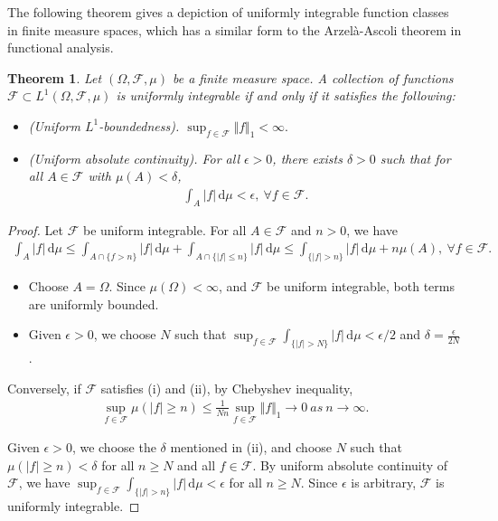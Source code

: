 \documentclass{article}
\numberwithin{equation}{section}
\renewcommand{\d}{\mathrm{d}}
\theoremstyle{plain}
\newtheorem{theorem}{Theorem}[section]
\theoremstyle{definition}
\begin{document}
The following theorem gives a depiction of uniformly integrable function classes in finite measure spaces, which has a similar form to the Arzelà-Ascoli theorem in functional analysis.

\begin{theorem}\label{thm:1.72} Let $(\Omega,\mathscr{F},\mu)$ be a finite measure space. A collection of functions $\mathcal{F}\subset L^1(\Omega,\mathscr{F},\mu)$ is uniformly integrable if and only if it satisfies the following:
\begin{itemize}
	\item[(i)] (Uniform $L^1$-boundedness). $\sup_{f\in\mathcal{F}}\Vert f\Vert_1 <\infty.$
	\item[(ii)] (Uniform absolute continuity). For all $\epsilon>0$, there exists $\delta>0$ such that for all $A\in\mathscr{F}$ with $\mu(A)<\delta$,
	\begin{align*}
		\int_A\vert f\vert\,\d \mu < \epsilon,\ \forall f\in\mathcal{F}.
	\end{align*}
\end{itemize}
\end{theorem}
\begin{proof}
Let $\mathcal{F}$ be uniform integrable. For all $A\in\mathscr{F}$ and $n>0$, we have
\begin{align*}
	\int_A\vert f\vert\,\d \mu \leq \int_{A\cap\{f>n\}}\vert f\vert\,\d \mu + \int_{A\cap\{\vert f\vert\leq n\}}\vert f\vert\,\d \mu \leq \int_{\{\vert f\vert>n\}}\vert f\vert\,\d \mu + n\mu(A),\ \forall f\in\mathcal{F}.
\end{align*}
\begin{itemize}
	\item[(i)] Choose $A=\Omega$. Since $\mu(\Omega)<\infty$, and $\mathcal{F}$ be uniform integrable, both terms are uniformly bounded.
	\item[(ii)] Given $\epsilon>0$, we choose $N$ such that $\sup_{f\in\mathcal{F}}\int_{\{\vert f\vert>N\}}\vert f\vert\,\d \mu<\epsilon/2$ and $\delta = \frac{\epsilon}{2N}$.\vspace{0.1cm}
\end{itemize}

Conversely, if $\mathcal{F}$ satisfies (i) and (ii), by Chebyshev inequality,
\begin{align*}
	\sup_{f\in\mathcal{F}}\mu(\vert f\vert\geq n) \leq \frac{1}{Nn}\sup_{f\in\mathcal{F}}\Vert f\Vert_1\to 0\ \textit{as}\ n\to\infty.
\end{align*}

Given $\epsilon>0$, we choose the $\delta$ mentioned in (ii), and choose $N$ such that $\mu(\vert f\vert\geq n)<\delta$ for all $n\geq N$ and all $f\in\mathcal{F}$. By uniform absolute continuity of $\mathcal{F}$, we have $\sup_{f\in\mathcal{F}}\int_{\{\vert f\vert > n\}}\vert f\vert\,\d \mu<\epsilon$ for all $n\geq N$. Since $\epsilon$ is arbitrary, $\mathcal{F}$ is uniformly integrable.
\end{proof}
\end{document}
